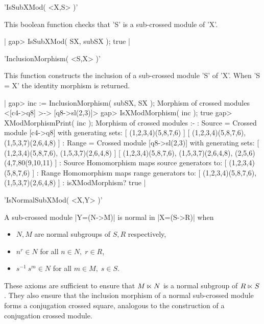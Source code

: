 'IsSubXMod( <X,S> )'

This boolean function checks that 'S' is a sub-crossed module of 'X'.

|    gap> IsSubXMod( SX, subSX );
    true  |

%

'InclusionMorphism( <S,X> )'

This function constructs the inclusion of a sub-crossed module 'S' of 'X'.
When  'S = X'  the identity morphism is returned.

|    gap> inc := InclusionMorphism( subSX, SX );
    Morphism of crossed modules <[c4->q8] >-> [q8->sl(2,3)]>
    gap> IsXModMorphism( inc );
    true
    gap> XModMorphismPrint( inc );
    Morphism of crossed modules :- 
    : Source = Crossed module [c4->q8] with generating sets:
      [ (1,2,3,4)(5,8,7,6) ]
      [ (1,2,3,4)(5,8,7,6), (1,5,3,7)(2,6,4,8) ]
    :  Range = Crossed module [q8->sl(2,3)] with generating sets:
      [ (1,2,3,4)(5,8,7,6), (1,5,3,7)(2,6,4,8) ]
      [ (1,2,3,4)(5,8,7,6), (1,5,3,7)(2,6,4,8), (2,5,6)(4,7,80(9,10,11) ]
    : Source Homomorphism maps source generators to:
      [ (1,2,3,4)(5,8,7,6) ]
    : Range Homomorphism maps range generators to:
      [ (1,2,3,4)(5,8,7,6), (1,5,3,7)(2,6,4,8) ] 
    :  isXModMorphism? true                            |

%

'IsNormalSubXMod( <X,Y> )'

A sub-crossed module |Y=(N->M)| is normal in |X=(S->R)| when
\begin{itemize}
\item {$N,M$ are normal subgroups of $S,R$ respectively,}
\item {$n^r \in N$ for all $n \in N, \; r \in R$,}
\item {$s^{-1}\ s^m \in N$ for all $m \in M, \; s \in S$.}
\end{itemize}
These axioms are sufficient to ensure that 
$M \semidirect N$  is a normal subgroup of 
$R \semidirect S$.                        %
They also ensure that the inclusion morphism of a normal
sub-crossed module forms a conjugation crossed square,
analogous to the construction of a conjugation crossed module.


